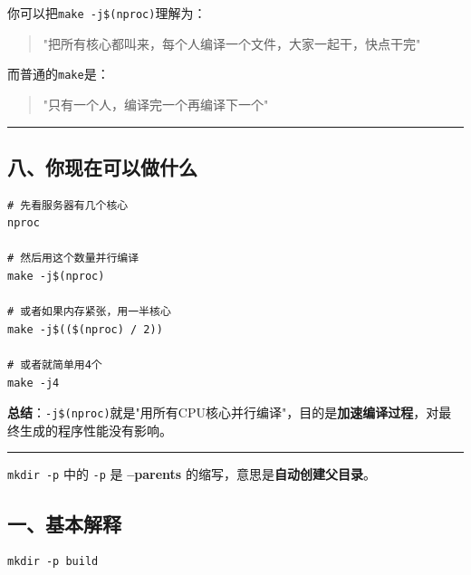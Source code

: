 \documentclass[11pt, a4paper]{article}
\begin{document}
\begin{aibox}
你可以把\texttt{make -j\$(nproc)}理解为：
\begin{quote}
"把所有核心都叫来，每个人编译一个文件，大家一起干，快点干完"
\end{quote}
而普通的\texttt{make}是：
\begin{quote}
"只有一个人，编译完一个再编译下一个"
\end{quote}

\begin{center}\rule{\textwidth}{0.4pt}\end{center}

\subsection*{八、你现在可以做什么}

\begin{tcolorbox}[colback=white,colframe=gray!50!white,boxrule=0.5pt,arc=2pt,left=5pt,right=5pt,top=5pt,bottom=5pt]
\begin{verbatim}
# 先看服务器有几个核心
nproc

# 然后用这个数量并行编译
make -j$(nproc)

# 或者如果内存紧张，用一半核心
make -j$(($(nproc) / 2))

# 或者就简单用4个
make -j4
\end{verbatim}
\end{tcolorbox}

\textbf{总结}：\texttt{-j\$(nproc)}就是"用所有CPU核心并行编译"，目的是\textbf{加速编译过程}，对最终生成的程序性能没有影响。

\vspace{2em}
\begin{center}\rule{\textwidth}{1pt}\end{center}
\vspace{1em}

\texttt{mkdir -p} 中的 \texttt{-p} 是 \textbf{--parents} 的缩写，意思是\textbf{自动创建父目录}。

\subsection*{一、基本解释}

\begin{tcolorbox}[colback=white,colframe=gray!50!white,boxrule=0.5pt,arc=2pt,left=5pt,right=5pt,top=5pt,bottom=5pt]
\begin{verbatim}
mkdir -p build
\end{verbatim}
\end{tcolorbox}


\end{aibox}
\end{document}
